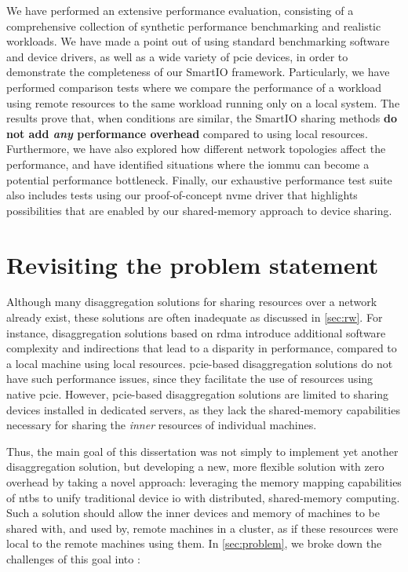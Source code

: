 We have performed an extensive performance evaluation, consisting of a comprehensive collection of synthetic performance benchmarking and realistic workloads.
%
We have made a point out of using standard benchmarking software and device drivers, as well as a wide variety of \gls{pcie} devices, in order to demonstrate the completeness of our SmartIO framework.
%
Particularly, we have performed comparison tests where we compare the performance of a workload using remote resources to the same workload running only on a local system.
%
The results prove that, when conditions are similar, the SmartIO sharing methods \textbf{do not add \emph{any} performance overhead} compared to using local resources.
%
Furthermore, we have also explored how different network topologies affect the performance, and have identified situations where the \gls{iommu} can become a potential performance bottleneck.
%
Finally, our exhaustive performance test suite also includes tests using our proof-of-concept \gls{nvme} driver that highlights possibilities that are enabled by our shared-memory approach to device sharing.






\section{Revisiting the problem statement}\label{sec:discussion}
Although many \gls{disaggregation} solutions for sharing resources over a network already exist, these solutions are often inadequate as discussed in \cref{sec:rw}. 
For instance, \gls{disaggregation} solutions based on \gls{rdma} introduce additional software complexity and indirections that lead to a disparity in performance, compared to a local machine using local resources. 
\Gls{pcie}-based \gls{disaggregation} solutions do not have such performance issues, since they facilitate the use of resources using native \gls{pcie}.
However, \gls{pcie}-based \gls{disaggregation} solutions are limited to sharing devices installed in dedicated servers, as they lack the shared-memory capabilities necessary for sharing the \emph{inner} resources of individual machines. 



Thus, the main goal of this dissertation was not simply to implement yet another \gls{disaggregation} solution, but developing a new, more flexible solution with zero overhead by taking a novel approach:
%
leveraging the memory mapping capabilities of \glspl{ntb} to unify traditional device \gls{io} with distributed, shared-memory computing.
%
Such a solution should allow the inner devices and memory of machines to be shared with, and used by, remote machines in a cluster, as if these resources were local to the remote machines using them.
%
In \cref{sec:problem}, we broke down the challenges of this goal into :



